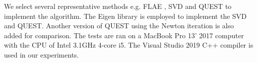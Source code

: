 \documentclass{birkjour}
\numberwithin{equation}{section}
\begin{document}
We select several representative methods e.g. FLAE \cite{Wu2017}, SVD \cite{Horn1987} and QUEST \cite{Shuster1981} to implement the algorithm. The Eigen library is employed to implement the SVD and QUEST. Another version of QUEST using the Newton iteration is also added for comparison. The tests are ran on a MacBook Pro 13' 2017 computer with the CPU of Intel 3.1GHz 4-core i5. The Visual Studio 2019 C++ compiler is used in our experiments. %

\end{document}
